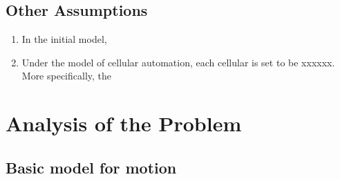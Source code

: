 \documentclass{icmmcm}
\begin{document}
\subsection{Other Assumptions}
\begin{enumerate}
\item In the initial model, 
\item Under the model of cellular automation, each cellular is set to be xxxxxx. More specifically, the 
\end{enumerate}

\section{Analysis of the Problem}
\subsection{Basic model for motion}
\end{document}
